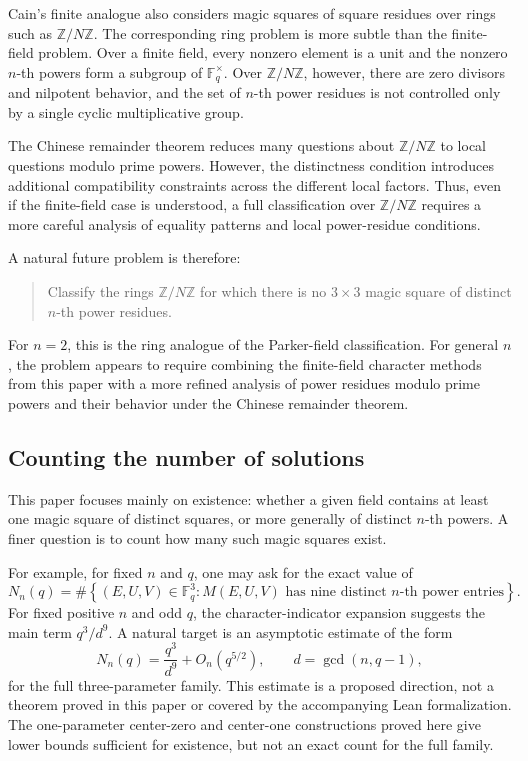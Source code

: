 \documentclass{article}
\newcommand{\Z}{\mathbb Z}
\newcommand{\F}{\mathbb F}
\theoremstyle{definition}
\numberwithin{equation}{section}
\begin{document}
Cain's finite analogue also considers magic squares of square residues over
rings such as \(\Z/N\Z\). The corresponding ring problem is more subtle than the
finite-field problem. Over a finite field, every nonzero element is a unit and
the nonzero \(n\)-th powers form a subgroup of \(\F_q^\times\). Over \(\Z/N\Z\),
however, there are zero divisors and nilpotent behavior, and the set of
\(n\)-th power residues is not controlled only by a single cyclic multiplicative
group.

The Chinese remainder theorem reduces many questions about \(\Z/N\Z\) to local
questions modulo prime powers. However, the distinctness condition introduces
additional compatibility constraints across the different local factors. Thus,
even if the finite-field case is understood, a full classification over
\(\Z/N\Z\) requires a more careful analysis of equality patterns and local
power-residue conditions.

A natural future problem is therefore:
\begin{quote}
Classify the rings \(\Z/N\Z\) for which there is no \(3\times3\) magic square
of distinct \(n\)-th power residues.
\end{quote}
For \(n=2\), this is the ring analogue of the Parker-field classification. For
general \(n\), the problem appears to require combining the finite-field
character methods from this paper with a more refined analysis of power residues
modulo prime powers and their behavior under the Chinese remainder theorem.

\subsection{Counting the number of solutions}

This paper focuses mainly on existence: whether a given field contains at least
one magic square of distinct squares, or more generally of distinct \(n\)-th
powers. A finer question is to count how many such magic squares exist.

For example, for fixed \(n\) and \(q\), one may ask for the exact value of
\[
N_n(q)=
\#\left\{(E,U,V)\in\F_q^3:
M(E,U,V)\text{ has nine distinct }n\text{-th power entries}\right\}.
\]
For fixed positive \(n\) and odd \(q\), the character-indicator expansion
suggests the main term \(q^3/d^9\). A natural target is an asymptotic estimate
of the form
\[
N_n(q)=
\frac{q^3}{d^9}
+
O_n(q^{5/2}),
\qquad
 d=\gcd(n,q-1),
\]
for the full three-parameter family. This estimate is a proposed direction,
not a theorem proved in this paper or covered by the accompanying Lean
formalization. The one-parameter center-zero and center-one constructions
proved here give lower bounds sufficient for existence, but not an exact count
for the full family.
\end{document}
